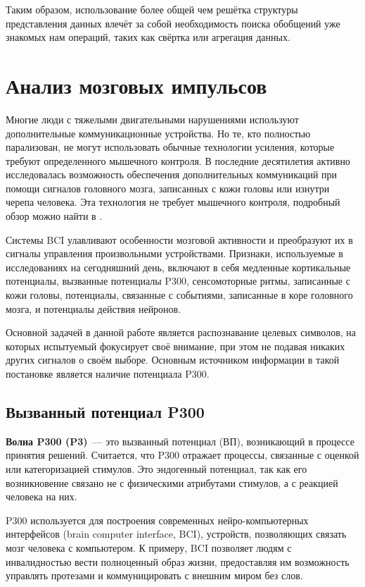 \documentclass[12pt]{article}
\begin{document}
Таким образом, использование более общей чем решётка структуры представления данных влечёт за собой необходимость поиска обобщений уже знакомых нам операций, таких как свёртка или агрегация данных.

\section{Анализ мозговых импульсов}

Многие люди с тяжелыми двигательными нарушениями используют дополнительные коммуникационные устройства. Но те, кто полностью парализован, не могут использовать обычные технологии усиления, которые требуют определенного мышечного контроля. В последние десятилетия активно исследовалась  возможность обеспечения дополнительных коммуникаций при помощи сигналов головного мозга, записанных с кожи головы или изнутри черепа человека. Эта технология не требует мышечного контроля, подробный обзор можно найти в \cite{wolpaw2002brain}. 

Системы BCI улавливают особенности мозговой активности и преобразуют их в сигналы управления произвольными устройствами. Признаки, используемые в исследованиях на сегодняшний день, включают в себя медленные кортикальные потенциалы, вызванные потенциалы P300, сенсомоторные ритмы, записанные с кожи головы, потенциалы, связанные с событиями, записанные в коре головного мозга, и потенциалы действия нейронов. 

Основной задачей в данной работе является распознавание целевых символов, на которых испытуемый фокусирует своё внимание, при этом не подавая никаких других сигналов о своём выборе. Основным источником информации в такой постановке является наличие потенциала P300.

\subsection{Вызванный потенциал P300}

\textbf{Волна P300 (P3)}~--- это вызванный потенциал (ВП), возникающий в процессе принятия решений. Считается, что P300 отражает процессы, связанные с оценкой или категоризацией стимулов. Это эндогенный потенциал, так как его возникновение связано не с физическими атрибутами стимулов, а с реакцией человека на них.

P300 используется для построения современных нейро-компьютерных интерфейсов (brain computer interface, BCI), устройств, позволяющих связать мозг человека с компьютером. К примеру, BCI позволяет людям с инвалидностью вести полноценный образ жизни, предоставляя им возможность управлять протезами и коммуницировать с внешним миром без слов.
\end{document}
